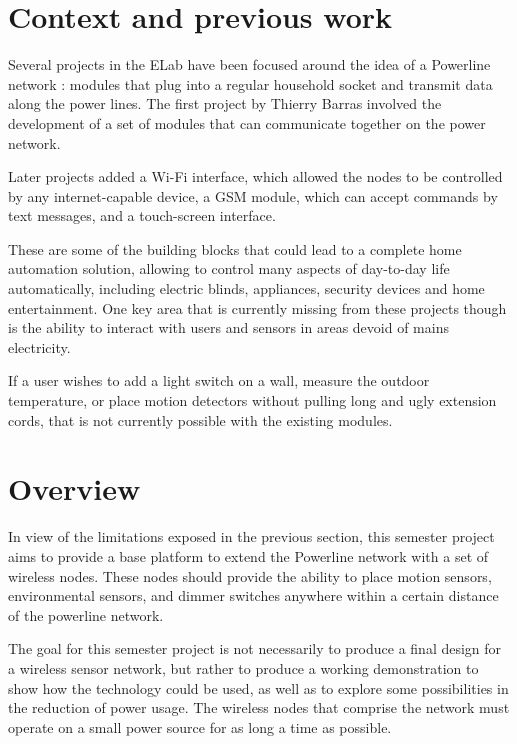 \section{Context and previous work}

Several projects in the ELab have been focused around the idea of a Powerline
network : modules that plug into a regular household socket and transmit data
along the power lines. The first project by Thierry Barras\cite{barras2009}
involved the development of a set of modules that can communicate together on
the power network.

Later projects added a Wi-Fi interface\cite{sallin2010}, which allowed the nodes
to be controlled by any internet-capable device, a GSM module\cite{sallin2010},
which can accept commands by text messages, and a touch-screen interface.

These are some of the building blocks that could lead to a complete home
automation solution, allowing to control many aspects of day-to-day life
automatically, including electric blinds, appliances, security devices and home
entertainment.  One key area that is currently missing from these projects
though is the ability to interact with users and sensors in areas devoid of
mains electricity.

If a user wishes to add a light switch on a wall, measure the outdoor
temperature, or place motion detectors without pulling long and ugly extension
cords, that is not currently possible with the existing modules.

\pagebreak
\section{Overview}
In view of the limitations exposed in the previous section, this semester
project aims to provide a base platform to extend the Powerline network with a
set of wireless nodes. These nodes should provide the ability to place motion
sensors, environmental sensors, and dimmer switches anywhere within a certain
distance of the powerline network. 


The goal for this semester project is not necessarily to produce a final design
for a wireless sensor network, but rather to produce a working demonstration to
show how the technology could be used, as well as to explore some possibilities
in the reduction of power usage.  The wireless nodes that comprise the network
must operate on a small power source for as long a time as possible.

